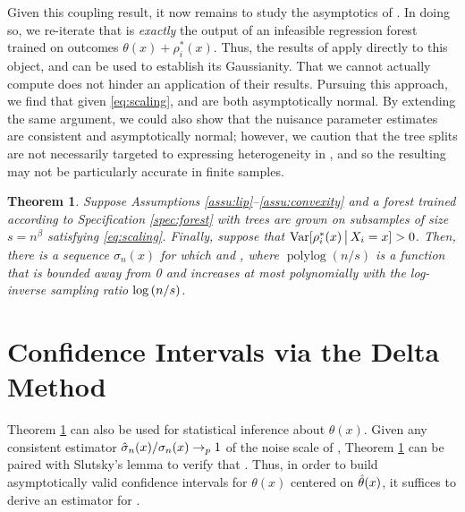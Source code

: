 \documentclass[aos]{imsart}
\theoremstyle{plain}
\newtheorem{theo}[prop]{Theorem}
\theoremstyle{definition}
\theoremstyle{remark}
\begin{document}
\begin{CJK}{UTF8}{gbsn}
Given this coupling result, it now remains to study the asymptotics of .
In doing so, we re-iterate that  is \emph{exactly} the output of an infeasible
regression forest trained on outcomes $\theta(x) + \rho_i^*(x)$. Thus, the results of
\citet{wager2015estimation} apply directly to this object, and can be used to establish
its Gaussianity. That we cannot actually compute 
does not hinder an application of their results.
Pursuing this approach, we find that given \eqref{eq:scaling},  and
 are both asymptotically normal. By extending the same
argument, we could also show that the nuisance parameter estimates  are
consistent and asymptotically normal; however, we caution that the tree splits are not necessarily
targeted to expressing heterogeneity in , and so the resulting 
may not be particularly accurate in finite samples.

\begin{theo}
\label{theo:gauss}
Suppose Assumptions \ref{assu:lip}--\ref{assu:convexity} and
a forest trained according to Specification \ref{spec:forest} with
trees are grown on subsamples of size $s = n^\beta $ satisfying \eqref{eq:scaling}.
Finally, suppose that $\operatorname{Var}[\rho_i^*(x) \,\big|\, X_i = x] > 0$. Then, there is a sequence
$\sigma_n(x)$ for which
 and
,
where $\operatorname{polylog}(n/s)$ is a function that is bounded away from 0 and
increases at most polynomially with the log-inverse sampling ratio $\log\left(n/s\right)$.
\end{theo}



\section{Confidence Intervals via the Delta Method}
\label{sec:delta_method}

Theorem \ref{theo:gauss} can also be used for statistical inference about $\theta(x)$. Given any
consistent estimator $\hat{\sigma}_n(x)/\sigma_n(x) \rightarrow_p 1$ of the noise scale
of , Theorem \ref{theo:gauss} can be paired with Slutsky's lemma
to verify that
.
Thus, in order to build asymptotically valid confidence intervals for $\theta(x)$ centered on $\hat{\theta}(x)$,
it suffices to derive an estimator for .


\end{CJK}
\end{document}
